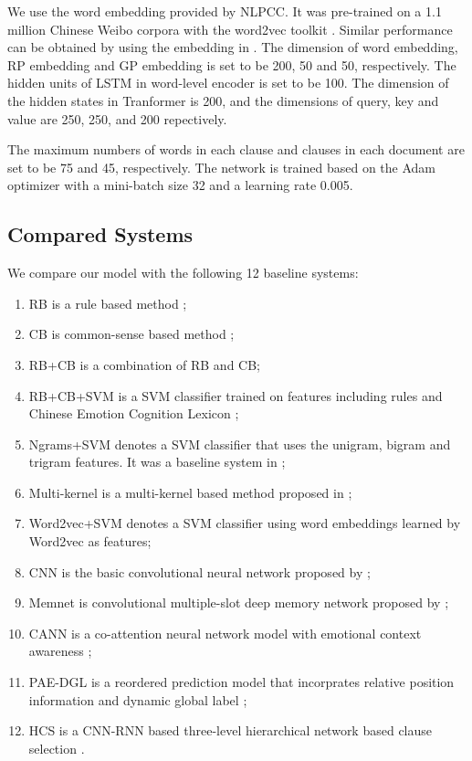 \documentclass{article}
\begin{document}
We use the word embedding provided by NLPCC. It was pre-trained on a 1.1 million Chinese Weibo corpora with the word2vec toolkit \cite{mikolov2013distributed}. Similar performance can be obtained by using the embedding in \cite{gui2017question}. The dimension of word embedding, RP embedding and GP embedding is set to be 200, 50 and 50, respectively. The hidden units of LSTM in word-level encoder is set to be 100. The dimension of the hidden states in Tranformer is 200, and the dimensions of query, key and value are 250, 250, and 200 repectively.

The maximum numbers of words in each clause and clauses in each document are set to be 75 and 45, respectively. The network is trained based on the Adam optimizer with a mini-batch size 32 and a learning rate 0.005.
\subsection{Compared Systems}
We compare our model with the following 12 baseline systems:
\begin{enumerate}[1)]
\item RB is a rule based method \cite{lee2010text};
\item CB is common-sense based method \cite{russo2011emocause};
\item RB+CB is a combination of RB and CB;
\item RB+CB+SVM is a SVM classifier trained on features including rules \cite{lee2010text} and Chinese Emotion Cognition Lexicon \cite{xu2017ensemble}; 
\item Ngrams+SVM denotes a SVM classifier that uses the unigram, bigram and trigram features. It was a baseline system in \cite{gui2017question}; 
\item Multi-kernel is a multi-kernel based method proposed in \cite{gui2016event};
\item Word2vec+SVM denotes a SVM classifier using word embeddings learned by Word2vec as features; 
\item CNN is the basic convolutional neural network proposed by \cite{kim2014convolutional};
\item Memnet is convolutional multiple-slot deep memory network proposed by \cite{gui2017question};
\item CANN is a co-attention neural network model with emotional context awareness \cite{li2018co};
\item PAE-DGL is a reordered prediction model that incorprates relative position information and dynamic global label \cite{ding2019independent};
\item HCS is a CNN-RNN based three-level hierarchical network based clause selection \cite{yu2019multiple}.
\end{enumerate}
\end{document}
